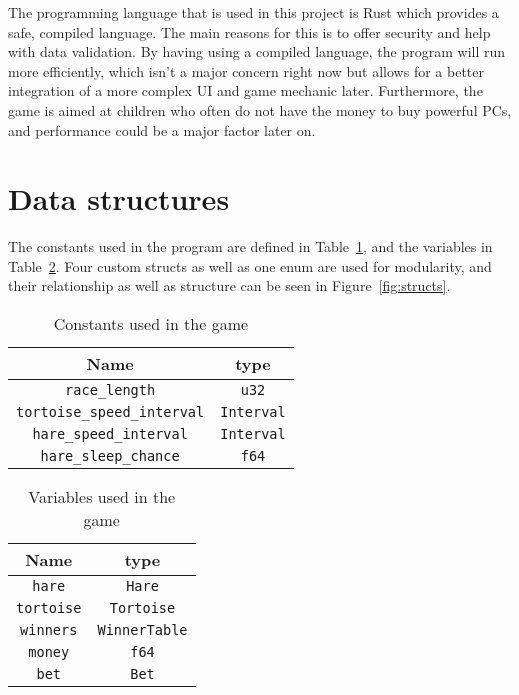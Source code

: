 \documentclass[11pt]{article}
\begin{document}
The programming language that is used in this project is Rust \cite{rust} which provides a
safe, compiled language. The main reasons for this is to offer security and help with data
validation. By having using a compiled language, the program will run more efficiently, which
isn't a major concern right now but allows for a better integration of a more complex UI and
game mechanic later. Furthermore, the game is aimed at children who often do not have the money
to buy powerful PCs, and performance could be a major factor later on.

\section{Data structures}
The constants used in the program are defined in Table~\ref{tab:consts}, and the variables
in Table~\ref{tab:vars}. Four custom structs as well as one enum are used for modularity, and their relationship as
well as structure can be seen in Figure~\ref{fig:structs}.

\begin{table}[!ht]
	\centering
	\begin{tabular}{ | c c | }
		\hline
		Name                               & type              \\
		\hline
		\texttt{race\_length}              & \texttt{u32}      \\
		\texttt{tortoise\_speed\_interval} & \texttt{Interval} \\
		\texttt{hare\_speed\_interval}     & \texttt{Interval} \\
		\texttt{hare\_sleep\_chance}       & \texttt{f64}      \\
		\hline
	\end{tabular}
	\caption{Constants used in the game}%
	\label{tab:consts}
\end{table}
\begin{table}[!ht]
	\centering
	\begin{tabular}{ | c c | }
		\hline
		Name              & type                 \\ \hline
		\texttt{hare}     & \texttt{Hare}        \\
		\texttt{tortoise} & \texttt{Tortoise}    \\
		\texttt{winners}  & \texttt{WinnerTable} \\
		\texttt{money}    & \texttt{f64}         \\
		\texttt{bet}      & \texttt{Bet}         \\ \hline
	\end{tabular}
	\caption{Variables used in the game}
	\label{tab:vars}
\end{table}
\end{document}
